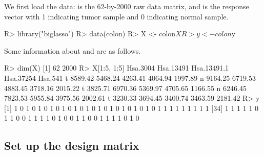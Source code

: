 We first load the data:  is the 62-by-2000 raw data matrix, and  is the response vector with 1 indicating tumor sample and 0 indicating normal sample.

\begin{example}
R> library("biglasso")
R> data(colon)
R> X <- colon$X
R> y <- colon$y
\end{example}

Some information about  and  are as follows.
\begin{example}
R> dim(X)
[1]   62 2000
R> X[1:5, 1:5]
  Hsa.3004 Hsa.13491 Hsa.13491.1 Hsa.37254 Hsa.541
t  8589.42   5468.24     4263.41   4064.94 1997.89
n  9164.25   6719.53     4883.45   3718.16 2015.22
t  3825.71   6970.36     5369.97   4705.65 1166.55
n  6246.45   7823.53     5955.84   3975.56 2002.61
t  3230.33   3694.45     3400.74   3463.59 2181.42
R> y
 [1] 1 0 1 0 1 0 1 0 1 0 1 0 1 0 1 0 1 0 1 0 1 0 1 0 1 1 1 1 1 1 1 1 1
[34] 1 1 1 1 1 0 1 1 0 0 1 1 1 1 0 1 0 0 1 1 0 0 1 1 1 1 0 1 0
\end{example}

\subsection{Set up the design matrix}

